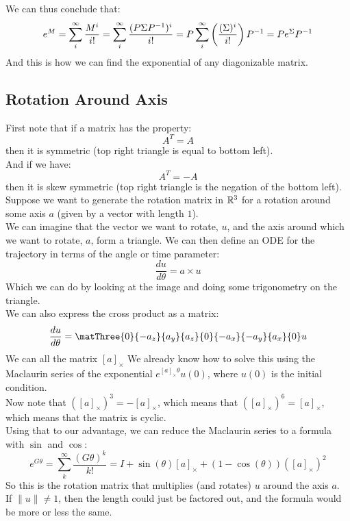 \documentclass[12pt]{article}
\begin{document}
We can thus conclude that:
\[ e^{M} = \sum_i^\infty \dfrac{M^i}{i!} 
= \sum_i^\infty \dfrac{(P\Sigma P^{-1})^i}{i!}
= P\sum_i^\infty \left( \dfrac{(\Sigma)^i}{i!} \right) P^{-1}
= Pe^{\Sigma}P^{-1} \]
And this is how we can find the exponential
of any diagonizable matrix. \\

\newpage

\subsection*{Rotation Around Axis}

First note that if a matrix has the property:
\[ A^T = A \]
then it is symmetric (top right triangle
is equal to bottom left). \\
And if we have:
\[ A^T = -A \]
then it is skew symmetric (top right triangle
is the negation of the bottom left). \\

Suppose we want to generate the rotation
matrix in $\mathbb{R}^3$ for a rotation around some
axis $a$ (given by a vector with length $1$). \\

We can imagine that the vector we want to rotate,
$u$, and the axis around which we want
to rotate, $a$,
form a triangle.
We can then define an ODE for the trajectory
in terms of the angle or time parameter:
\[ \dfrac{du}{d\theta} = a \times u \]
Which we can do by looking at the image
and doing some trigonometry on the triangle. \\
We can also express the cross product as a matrix:
\[ \dfrac{du}{d\theta} = 
\matThree{0}{-a_z}{a_y}{a_z}{0}{-a_x}{-a_y}{a_x}{0}
u \]
We can all the matrix $[a]_\times$
We already know how to solve this using the
Maclaurin series of the exponential 
$e^{[a]_\times\theta}u(0)$,
where $u(0)$ is the initial condition. \\

Now note that $([a]_\times)^3 = -[a]_\times$,
which means that $([a]_\times)^6 = [a]_\times$,
which means that the matrix is cyclic. \\
Using that to our advantage,
we can reduce the Maclaurin series to
a formula with $\sin$ and $\cos$:
\[ e^{G\theta} = \sum_k^{\infty} 
\dfrac{(G\theta)^k}{k!}
= I + \sin(\theta)[a]_\times 
+ (1-\cos(\theta))([a]_\times)^2 \]
So this is the rotation matrix
that multiplies (and rotates) $u$
around the axis $a$. \\

If $\|u\| \neq 1$, then the length
could just be factored out,
and the formula would be more or less
the same. \\ 
\end{document}

